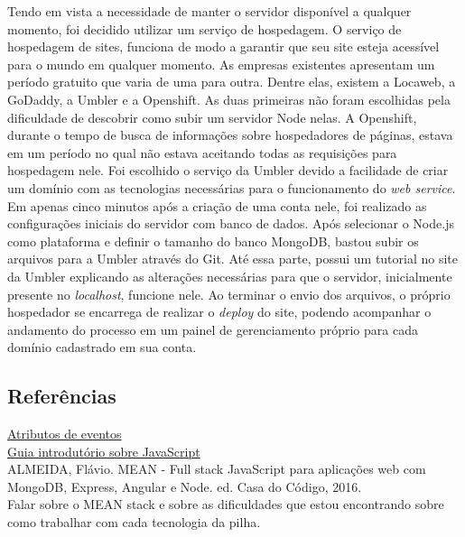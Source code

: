 \documentclass[
	12pt,				%
	oneside,			%
	a4paper,			%
	brazil				%
]{abntex2}
\begin{document}
Tendo em vista a necessidade de manter o servidor disponível a qualquer momento, foi decidido utilizar um serviço de hospedagem.
O serviço de hospedagem de sites, funciona de modo a garantir que seu site esteja acessível para o mundo em qualquer momento. As empresas existentes apresentam um período gratuito que varia de uma para outra. Dentre elas, existem a Locaweb, a GoDaddy, a Umbler e a Openshift.
As duas primeiras não foram escolhidas pela dificuldade de descobrir como subir um servidor Node nelas. A Openshift, durante o tempo de busca de informações sobre hospedadores de páginas, estava em um período no qual não estava aceitando todas as requisições para hospedagem nele.
Foi escolhido o serviço da Umbler devido a facilidade de criar um domínio com as tecnologias necessárias para o funcionamento do \textit{web service}. Em apenas cinco minutos após a criação de uma conta nele, foi realizado as configurações iniciais do servidor com banco de dados. Após selecionar o Node.js como plataforma e definir o tamanho do banco MongoDB, bastou subir os arquivos para a Umbler através do Git. Até essa parte, possui um tutorial no site da Umbler explicando as alterações necessárias para que o servidor, inicialmente presente no \textit{localhost}, funcione nele.
Ao terminar o envio dos arquivos, o próprio hospedador se encarrega de realizar o \textit{deploy} do site, podendo acompanhar o andamento do processo em um painel de gerenciamento próprio para cada domínio cadastrado em sua conta.


\subsection{Referências}

\href{https://www.w3schools.com/tags/ref_eventattributes.asp}{Atributos de eventos}\\
\href{http://tableless.github.io/iniciantes/manual/js/}{Guia introdutório sobre JavaScript}\\

ALMEIDA, Flávio. MEAN - Full stack JavaScript para aplicações web com MongoDB, Express, Angular e Node. ed. Casa do Código, 2016.\\

Falar sobre o MEAN stack e sobre as dificuldades que estou encontrando sobre como trabalhar com cada tecnologia da pilha.
\end{document}
